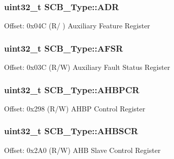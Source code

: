 \subsubsection[{\texorpdfstring{A\+DR}{ADR}}]{ uint32\+\_\+t S\+C\+B\+\_\+\+Type\+::\+A\+DR}\hypertarget{structSCB__Type_aaedf846e435ed05c68784b40d3db2bf2}{}\label{structSCB__Type_aaedf846e435ed05c68784b40d3db2bf2}
Offset\+: 0x04C (R/ ) Auxiliary Feature Register 
\subsubsection[{\texorpdfstring{A\+F\+SR}{AFSR}}]{ uint32\+\_\+t S\+C\+B\+\_\+\+Type\+::\+A\+F\+SR}\hypertarget{structSCB__Type_aeb77053c84f49c261ab5b8374e8958ef}{}\label{structSCB__Type_aeb77053c84f49c261ab5b8374e8958ef}
Offset\+: 0x03C (R/W) Auxiliary Fault Status Register 
\subsubsection[{\texorpdfstring{A\+H\+B\+P\+CR}{AHBPCR}}]{ uint32\+\_\+t S\+C\+B\+\_\+\+Type\+::\+A\+H\+B\+P\+CR}\hypertarget{structSCB__Type_aa7154549803e08073983216c159f74e3}{}\label{structSCB__Type_aa7154549803e08073983216c159f74e3}
Offset\+: 0x298 (R/W) A\+H\+BP Control Register 
\subsubsection[{\texorpdfstring{A\+H\+B\+S\+CR}{AHBSCR}}]{ uint32\+\_\+t S\+C\+B\+\_\+\+Type\+::\+A\+H\+B\+S\+CR}\hypertarget{structSCB__Type_ae1aa2246b75741ae5a7a965a66fa8d64}{}\label{structSCB__Type_ae1aa2246b75741ae5a7a965a66fa8d64}
Offset\+: 0x2\+A0 (R/W) A\+HB Slave Control Register 
